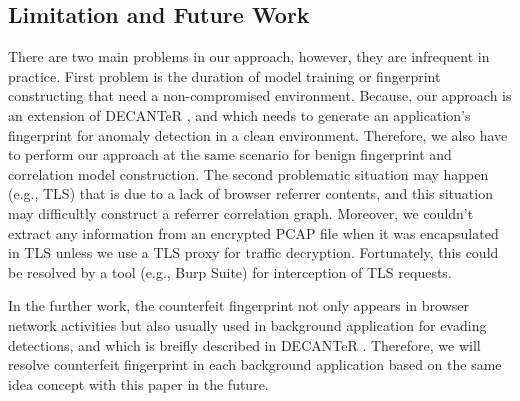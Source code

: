 \subsection{Limitation and Future Work}

There are two main problems in our approach, however, they are infrequent in practice. First problem is the duration of model training or fingerprint constructing that need a non-compromised environment. Because, our approach is an extension of DECANTeR \cite{bortolameotti2017decanter}, and which needs to generate an application's fingerprint for anomaly detection in a clean environment. Therefore, we also have to perform our approach at the same scenario for benign fingerprint and correlation model construction. The second problematic situation may happen (e.g., TLS) that is due to a lack of browser referrer contents, and this situation may difficultly construct a referrer correlation graph. Moreover, we couldn't extract any information from an encrypted PCAP file when it was encapsulated in TLS unless we use a TLS proxy for traffic decryption. Fortunately, this could be resolved by a tool (e.g., Burp Suite) for interception of TLS requests. 

In the further work, the counterfeit fingerprint not only appears in browser network activities but also usually used in background application for evading detections, and which is breifly described in DECANTeR \cite{bortolameotti2017decanter}. Therefore, we will resolve counterfeit fingerprint in each background application based on the same idea concept with this paper in the future.
